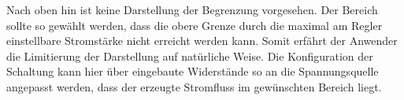 Nach oben hin ist keine Darstellung der Begrenzung vorgesehen. Der Bereich sollte so gewählt werden, dass die obere Grenze durch die maximal am Regler einstellbare Stromstärke nicht erreicht werden kann. Somit erfährt der Anwender die Limitierung der Darstellung auf natürliche Weise. Die Konfiguration der Schaltung kann hier über eingebaute Widerstände so an die Spannungsquelle angepasst werden, dass der erzeugte Stromfluss im gewünschten Bereich liegt.\\

